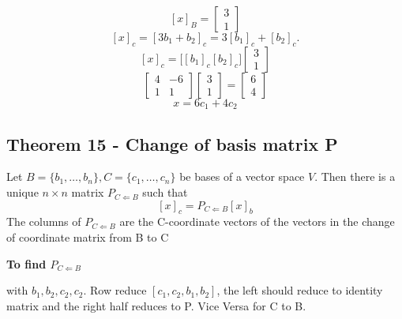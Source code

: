 \begin{equation}
	\label{}
	[x]_{B}=
	\begin{bmatrix}
	3\\1	
	\end{bmatrix}
\end{equation}
\begin{equation}
	\label{}
	[x]_{c}=[3b_{1}+b_{2}]_{c}=3[b_{1}]_{c}+[b_{2}]_{c}.
\end{equation}
\begin{equation}
	\label{}
	[x]_{c}=\bigl[ [b_{1}]_{c} [b_{2}]_{c}\bigr]
	\begin{bmatrix}
		3\\1
	\end{bmatrix}
\end{equation}
\begin{equation}
	\label{}
\begin{bmatrix}
	4&-6\\1&1	
\end{bmatrix}
\begin{bmatrix}
3\\1	
\end{bmatrix}=
\begin{bmatrix}
	6\\4
\end{bmatrix}
\end{equation}
\begin{equation}
	\label{}
x=6c_{1}+4c_{2}	
\end{equation}

\subsection{Theorem 15 - Change of basis matrix P}
 
Let $B=\{b_{1},\ldots,b_{n}\},C=\{c_{1},\ldots,c_{n}\}$ be bases of a vector space $V$. Then there is a unique $n\times n$ matrix $P_{C\Leftarrow B}$ such that 
\begin{equation}
	\label{}
[x]_{c}=P_{C\Leftarrow B}[x]_{b}
\end{equation}
The columns of $P_{C\Leftarrow B}$ are the C-coordinate vectors of the vectors in the change of coordinate matrix from B to C

 
\hfill


\textbf{To find $P_{C\Leftarrow B}$}

with $b_{1},b_{2},c_{2},c_{2}$. Row reduce $[c_{1},c_{2},b_{1},b_{2}]$, the left should reduce to identity matrix and the right half reduces to P. Vice Versa for C to B.

